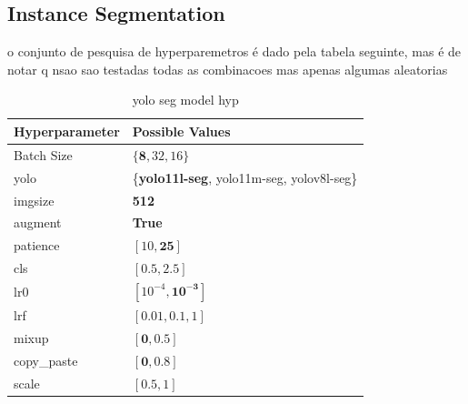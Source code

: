 \documentclass[conference]{IEEEtran}
\begin{document}
\subsection{Instance Segmentation}

o conjunto de pesquisa de hyperparemetros é dado pela tabela seguinte, mas é de notar q nsao sao testadas todas as combinacoes mas apenas algumas aleatorias


\begin{table}[H]
\centering
\caption{yolo seg model hyp}
\label{parametrosseg}
\begin{tabular}{ll}
\toprule
\textbf{Hyperparameter} & \textbf{Possible Values} \\
\midrule
Batch Size & $\{\mathbf{8}, 32, 16\}$ \\
yolo & \{\textbf{yolo11l-seg}, yolo11m-seg, yolov8l-seg\} \\
imgsize & \textbf{512} \\
augment & \textbf{True} \\
patience & $[10, \mathbf{25}]$ \\
cls & $[0.5, 2.5]$ \\
lr0 & $[10^{-4}, \mathbf{10^{-3}}]$ \\
lrf & $[0.01, \mathbf{0.1}, 1]$ \\
mixup & $[\mathbf{0}, 0.5]$ \\
copy\_paste & $[\mathbf{0}, 0.8]$ \\
scale & $[\mathbf{0.5}, 1]$ \\
\bottomrule
\end{tabular}
\end{table}
\end{document}
